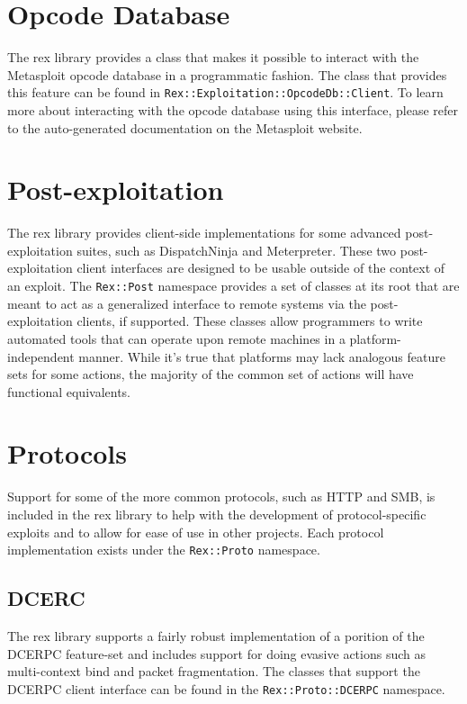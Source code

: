 \documentclass{report}
\begin{document}
    \section{Opcode Database}

\par
The rex library provides a class that makes it possible to interact
with the Metasploit opcode database in a programmatic fashion.  The
class that provides this feature can be found in
\texttt{Rex::Exploitation::OpcodeDb::Client}.  To learn more about
interacting with the opcode database using this interface, please
refer to the auto-generated documentation on the Metasploit website.

    \section{Post-exploitation}

\par
The rex library provides client-side implementations for some
advanced post-exploitation suites, such as DispatchNinja and
Meterpreter. These two post-exploitation client interfaces are
designed to be usable outside of the context of an exploit.  The
\texttt{Rex::Post} namespace provides a set of classes at its root
that are meant to act as a generalized interface to remote systems
via the post-exploitation clients, if supported.  These classes
allow programmers to write automated tools that can operate upon
remote machines in a platform-independent manner.  While it's true
that platforms may lack analogous feature sets for some actions, the
majority of the common set of actions will have functional
equivalents.

    \section{Protocols}

\par
Support for some of the more common protocols, such as HTTP and SMB,
is included in the rex library to help with the development of
protocol-specific exploits and to allow for ease of use in other
projects.  Each protocol implementation exists under the
\texttt{Rex::Proto} namespace.

        \subsection{DCERC}

\par
The rex library supports a fairly robust implementation of a
porition of the DCERPC feature-set and includes support for doing
evasive actions such as multi-context bind and packet fragmentation.
The classes that support the DCERPC client interface can be found in
the \texttt{Rex::Proto::DCERPC} namespace.
\end{document}
